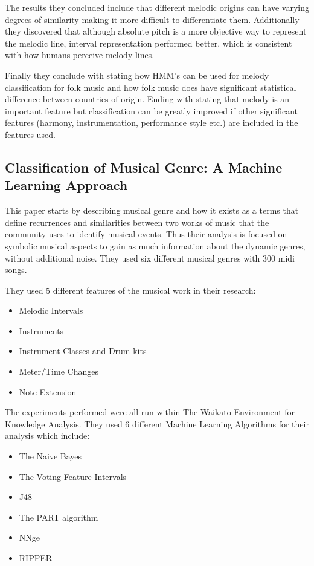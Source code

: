 \documentclass{article}
\begin{document}
	The results they concluded include that different melodic origins can have varying degrees of similarity making it more difficult to differentiate them. Additionally they discovered that although absolute pitch is a more objective way to represent the melodic line, interval representation performed better, which is consistent with how humans perceive melody lines.
	
	Finally they conclude with stating how HMM's can be used for melody classification for folk music and how folk music does have significant statistical difference between countries of origin. Ending with stating that melody is an important feature but classification can be greatly improved if other significant features (harmony, instrumentation, performance style etc.) are included in the features used.
	 
	\subsection{Classification of Musical Genre: A Machine Learning Approach}
	This paper starts by describing musical genre and how it exists as a terms that define recurrences and similarities between two works of music that the community uses to identify musical events. Thus their analysis is focused on symbolic musical aspects to gain as much information about the dynamic genres, without additional noise. They used six different musical genres with 300 midi songs.
	
	They used 5 different features of the musical work in their research:
	\begin{itemize}
		\item Melodic Intervals
		\item Instruments
		\item Instrument Classes and Drum-kits
		\item Meter/Time Changes
		\item Note Extension
	\end{itemize}
	
	The experiments performed were all run within The Waikato Environment for Knowledge Analysis. They used 6 different Machine Learning Algorithms for their analysis which include:
	\begin{itemize}
		\item The Naive Bayes
		\item The Voting Feature Intervals
		\item J48
		\item The PART algorithm
		\item NNge
		\item RIPPER
	\end{itemize}
\end{document}
